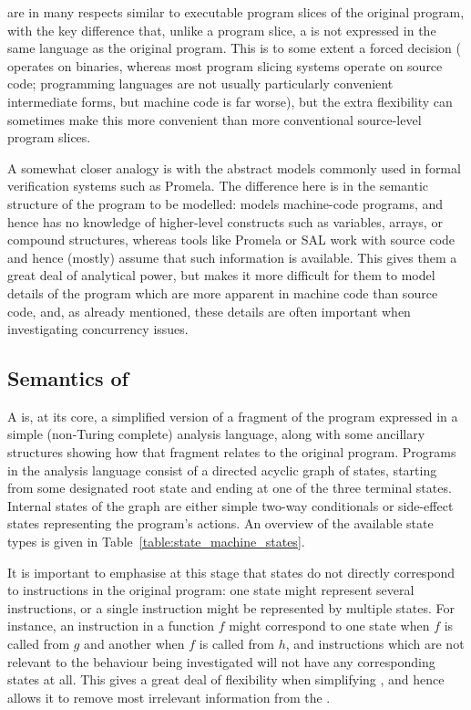 {\STateMachines} are in many respects similar to executable program
slices of the original program, with the key difference that, unlike a
program slice, a {\StateMachine} is not expressed in the same language
as the original program.  This is to some extent a forced decision
({\technique} operates on binaries, whereas most program slicing
systems operate on source code; programming languages are not usually
particularly convenient intermediate forms, but machine code is far
worse), but the extra flexibility can sometimes make this more
convenient than more conventional source-level program slices.

A somewhat closer analogy is with the abstract models commonly used in
formal verification systems such as Promela\cite{Holzmann1991}.  The
difference here is in the semantic structure of the program to be
modelled: {\technique} models machine-code programs, and hence has no
knowledge of higher-level constructs such as variables, arrays, or
compound structures, whereas tools like Promela or
SAL\cite{Howard2006} work with source code and hence
(mostly) assume
that such information is available.  This gives them a great deal of
analytical power, but makes it more difficult for them to model
details of the program which are more apparent in machine code than
source code, and, as already mentioned, these details are often
important when investigating concurrency issues.

\subsection{Semantics of {\StateMachines}}

A {\StateMachine} is, at its core, a simplified version of a fragment
of the program expressed in a simple (non-Turing complete) analysis
language, along with some ancillary structures showing how that
fragment relates to the original program.  Programs in the analysis
language consist of a directed acyclic graph of states, starting from
some designated root state and ending at one of the three terminal
states.  Internal states of the graph are either simple two-way
conditionals or side-effect states representing the program's actions.
An overview of the available state types is given in
Table~\ref{table:state_machine_states}.

It is important to emphasise at this stage that {\StateMachines}
states do not directly correspond to instructions in the original
program: one state might represent several instructions, or a single
instruction might be represented by multiple states.  For instance, an
instruction in a function $f$ might correspond to one state when $f$
is called from $g$ and another when $f$ is called from $h$, and
instructions which are not relevant to the behaviour being
investigated will not have any corresponding states at all.  This
gives {\technique} a great deal of flexibility when simplifying
{\StateMachines}, and hence allows it to remove most irrelevant
information from the {\StateMachine}.

